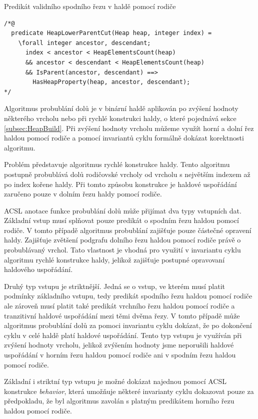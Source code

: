 \begin{listing}[H]
	\caption{Predikát validního spodního řezu v haldě pomocí rodiče}
	\label{acsl:HeapLowerParentCut}
	\begin{verbatim}
/*@
  predicate HeapLowerParentCut(Heap heap, integer index) =
    \forall integer ancestor, descendant;
      index < ancestor < HeapElementsCount(heap)
      && ancestor < descendant < HeapElementsCount(heap)
      && IsParent(ancestor, descendant) ==>
        HasHeapProperty(heap, ancestor, descendant);
*/
	\end{verbatim}
\end{listing}

Algoritmus probublání dolů je v binární haldě aplikován po zvýšení hodnoty některého vrcholu nebo při rychlé konstrukci haldy, o které pojednává sekce \ref{subsec:HeapBuild}. Při zvýšení hodnoty vrcholu můžeme využít horní a dolní řez haldou pomocí rodiče a pomocí invariantů cyklu formálně dokázat korektnosti algoritmu.

Problém představuje algoritmus rychlé konstrukce haldy. Tento algoritmu postupně probublává dolů rodičovské vrcholy od vrcholu s největším indexem až po index kořene haldy. Při tomto způsobu konstrukce je haldové uspořádání zaručeno pouze v dolním řezu haldy pomocí rodiče.

ACSL anotace funkce probublání dolů může přijímat dva typy vstupních dat. Základní vstup musí splňovat pouze predikát o spodním řezu haldou pomocí rodiče. V tomto případě algoritmus probublání zajišťuje pouze částečné opravení haldy. Zajišťuje zvětšení podgrafu dolního řezu haldou pomocí rodiče právě o probublávaný vrchol. Tato vlastnost je vhodná pro využití v invariantu cyklu algoritmu rychlé konstrukce haldy, jelikož zajišťuje postupné opravovaní haldového uspořádání.

Druhý typ vstupu je striktnější. Jedná se o vstup, ve kterém musí platit podmínky základního vstupu, tedy predikát spodního řezu haldou pomocí rodiče ale zároveň musí platit také predikát vrchního řezu haldou pomocí rodiče a tranzitivní haldové uspořádání mezi těmi dvěma řezy. V tomto případě může algoritmus probublání dolů za pomoci invariantu cyklu dokázat, že po dokončení cyklu v celé haldě platí haldové uspořádání. Tento typ vstupu je využíván při zvýšení hodnoty vrcholu, jelikož zvýšením hodnoty jsme neporušili haldové uspořádání v horním řezu haldou pomocí rodiče ani v spodním řezu haldou pomocí rodiče.

Základní i striktní typ vstupu je možné dokázat najednou pomocí ACSL konstrukce \textit{behavior}, která umožňuje některé invarianty cyklu dokazovat pouze za předpokladu, že byl algoritmus zavolán s platným predikátem horního řezu haldou pomocí rodiče.

